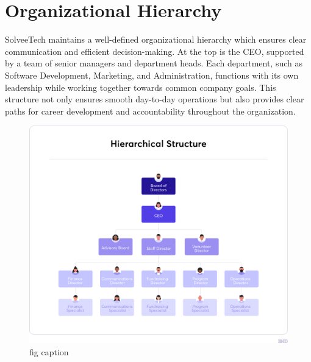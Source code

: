 \section{Organizational Hierarchy}
SolveeTech maintains a well-defined organizational hierarchy which ensures clear communication and efficient decision-making. At the top is the CEO, supported by a team of senior managers and department heads. Each department, such as Software Development, Marketing, and Administration, functions with its own leadership while working together towards common company goals. This structure not only ensures smooth day-to-day operations but also provides clear paths for career development and accountability throughout the organization.

\begin{figure}[h]
  \centering
  \includegraphics[width=.45\linewidth]{contents/chapters/chapter2/images/Hierarchical-Structure.png}
  \caption{fig caption}\label{fig:example}
\end{figure}
